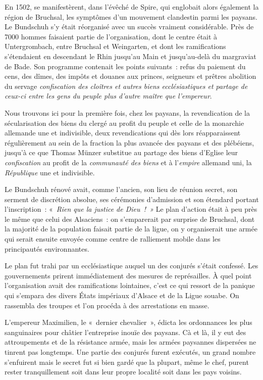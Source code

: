 \documentclass[french,twoside]{book} %
\begin{document}
En 1502, se manifestèrent, dans l’évêché de Spire, qui englobait alors également la région de Bruchsal, les symptômes d’un mouvement clandestin parmi les paysans. Le Bundschuh s’y était réorganisé avec un succès vraiment considérable. Près de 7000 hommes faisaient partie de l’organisation, dont le centre était à Untergrombach, entre Bruchsal et Weingarten, et dont les ramifications s’étendaient en descendant le Rhin jusqu’au Main et jusqu’au-delà du margraviat de Bade. Son programme contenait les points suivants : refus du paiement du cens, des dîmes, des impôts et douanes aux princes, seigneurs et prêtres abolition du servage \emph{confiscation des cloîtres et autres biens ecclésiastiques et partage de ceux-ci entre les gens du peuple plus d’autre maître que l’empereur}.\par
Nous trouvons ici pour la première fois, chez les paysans, la revendication de la sécularisation des biens du clergé au profit du peuple et celle de la monarchie allemande une et indivisible, deux revendications qui dès lors réapparaissent régulièrement au sein de la fraction la plus avancée des paysans et des plébéiens, jusqu’à ce que Thomas Münzer substitue au partage des biens d’Eglise leur \emph{confiscation} au profit de la \emph{communauté des biens} et à l’\emph{empire} allemand uni, la \emph{République} une et indivisible.\par
Le Bundschuh rénové avait, comme l’ancien, son lieu de réunion secret, son serment de discrétion absolue, ses cérémonies d’admission et son étendard portant l’inscription : « \emph{Rien que la justice de Dieu ! »} Le plan d’action était à peu près le même que celui des Alsaciens : on s’emparerait par surprise de Bruchsal, dont la majorité de la population faisait partie de la ligue, on y organiserait une armée qui serait ensuite envoyée comme centre de ralliement mobile dans les principautés environnantes.\par
Le plan fut trahi par un ecclésiastique auquel un des conjurés s’était confessé. Les gouvernements prirent immédiatement des mesures de représailles. À quel point l’organisation avait des ramifications lointaines, c’est ce qui ressort de la panique qui s’empara des divers États impériaux d’Alsace et de la Ligue souabe. On rassembla des troupes et l’on procéda à des arrestations en masse.\par
L’empereur Maximilien, le « dernier chevalier », édicta les ordonnances les plus sanguinaires pour châtier l’entreprise inouïe des paysans. Cà et là, il y eut des attroupements et de la résistance armée, mais les armées paysannes dispersées ne tinrent pas longtemps. Une partie des conjurés furent exécutés, un grand nombre s’enfuirent mais le secret fut si bien gardé que la plupart, même le chef, purent rester tranquillement soit dans leur propre localité soit dans les pays voisins.\par
\end{document}
